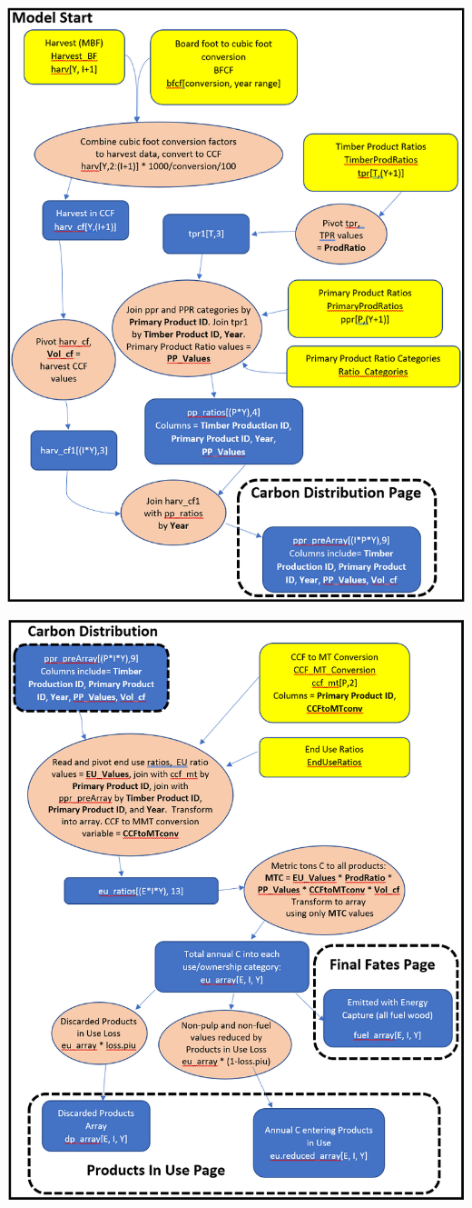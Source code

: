 \documentclass[
]{book}
\begin{document}
\newpage

\includegraphics[width=1\linewidth]{images/schematic-1}

\newpage

\includegraphics[width=1\linewidth]{images/schematic-2}
\end{document}
